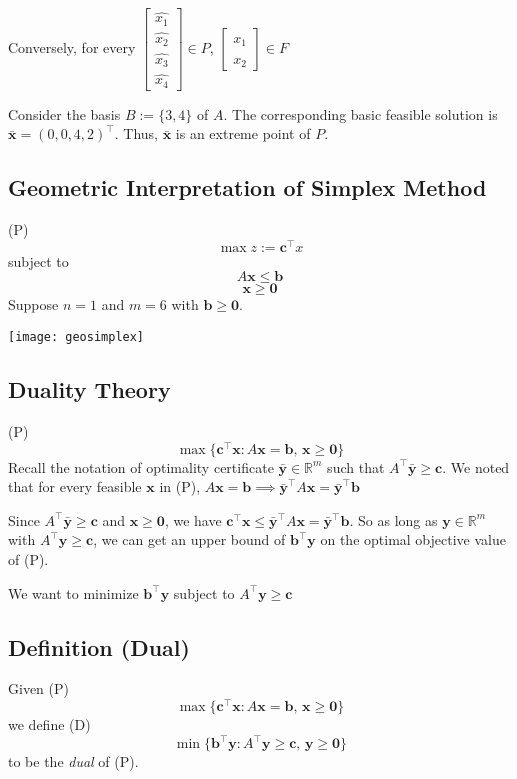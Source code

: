 Conversely, for every 
$ \begin{bmatrix}
    \hat{x_1}\\
    \hat{x_2}\\
    \hat{x_3}\\
    \hat{x_4}
\end{bmatrix}\in P $,
$ \begin{bmatrix}
    \hat{x_1}\\
    \hat{x_2}
\end{bmatrix}\in F $

Consider the basis $ B:=\{3,4\} $ of $ A $. The corresponding basic feasible
solution is $ \bm{\bar{x}}=(0,0,4,2)^\top $. Thus, $ \bm{\bar{x}} $ is
an extreme point of $ P $.

\subsection{Geometric Interpretation of Simplex Method}
(P)
\[ \max z:=\bm{c}^\top x \]
subject to
\[ A \bm{x}\le \bm{b} \]
\[ \bm{x}\ge \bm{0} \]
Suppose $ n=1 $ and $ m=6 $ with $ \bm{b}\ge \bm{0} $.

\begin{center}
    \texttt{[image: geosimplex]}
\end{center}

\subsection{Duality Theory}
(P)
\[ \max \{\bm{c}^{\top} \bm{x}: A \bm{x}=\bm{b},\, \bm{x} \geq \bm{0}\} \]
Recall the notation of optimality certificate $ \bm{\bar{y}}\in\mathbb{R}^m $ such that $ A ^\top \bm{\bar{y}}\ge \bm{c} $. We noted that for
every feasible $ \bm{x} $ in (P), $ A \bm{x}= \bm{b}\implies
\bm{\bar{y}}^\top A \bm{x}=\bm{\bar{y}}^\top \bm{b} $

Since $ A ^\top \bm{\bar{y}}\ge \bm{c} $ and $ \bm{x}\ge \bm{0} $,
we have $ \bm{c}^\top \bm{x}\le \bm{\bar{y}}^\top A \bm{x} =
\bm{\bar{y}}^\top \bm{b} $. So as long as $ \bm{y}\in\mathbb{R}^m $
with $ A ^\top \bm{y}\ge \bm{c} $, we can get an upper bound
of $ \bm{b} ^\top\bm{y} $ on the optimal objective value of (P).

We want to minimize $ \bm{b}^\top\bm{y} $ subject to $ A ^\top \bm{y}\ge \bm{c} $

\begin{defbox}
    \subsection{Definition (Dual)}
    Given (P)
    \[ \max \{\bm{c}^{\top} \bm{x}: A \bm{x}=\bm{b},\, \bm{x} \geq \bm{0}\} \]
    we define (D)
    \[ \min \{\bm{b}^{\top} \bm{y}: A^{\top} \bm{y} \geq \bm{c},\, \bm{y} \geq \bm{0}\}\]
    to be the \emph{dual} of (P).
\end{defbox}

